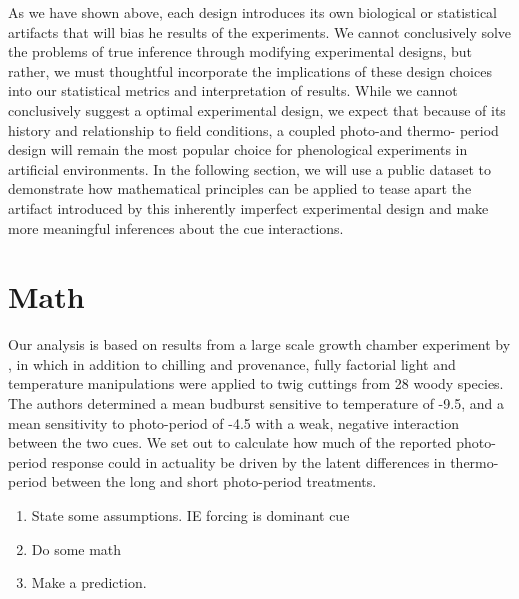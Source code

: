 \documentclass[12pt]{article}\usepackage[]{graphicx}\usepackage[]{color}
\begin{document}
\indent As we have shown above, each design introduces its own biological or statistical artifacts that will bias he results of the experiments. We cannot conclusively solve the problems of true inference through modifying experimental designs, but rather, we must thoughtful incorporate the implications of these design choices into our statistical metrics and interpretation of results. While we cannot conclusively suggest a optimal experimental design, we expect that because of its history and relationship to field conditions, a coupled photo-and thermo- period design will remain the most popular choice for phenological experiments in artificial environments. In the following section, we will use a public dataset to demonstrate how mathematical principles can be applied to tease apart the artifact introduced by this inherently imperfect experimental design and make more meaningful inferences about the cue interactions. 


\section*{Math}   
\indent\indent  Our analysis is based on results from a large scale growth chamber experiment by \citet{Flynn2018}, in which in addition to chilling and provenance, fully factorial light and temperature manipulations were applied to twig cuttings from 28 woody species. The authors determined a mean budburst  sensitive to temperature of -9.5, and  a mean sensitivity to photo-period of -4.5 with a weak, negative interaction between the two cues. We set out to calculate how much of the reported photo-period response could in actuality be driven by the latent differences in thermo-period between the long and short photo-period treatments. 
    \begin{enumerate}
    \item  State some assumptions. IE forcing is dominant cue
        \item Do some math
        \item  Make a prediction.
    \end{enumerate}
\end{document}
